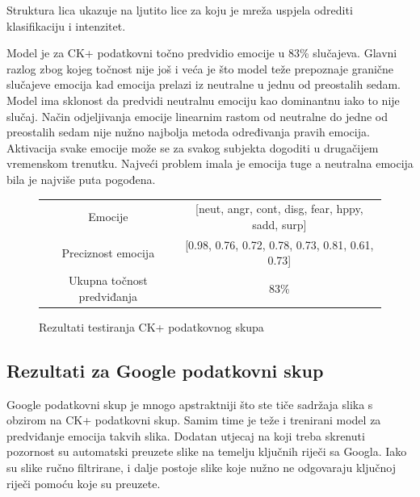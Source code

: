 \documentclass[times, utf8, zavrsni,numeric,pstricks]{fer}
\begin{document}
Struktura lica ukazuje na ljutito lice za koju je mreža uspjela odrediti klasifikaciju i intenzitet. 

Model je za CK+ podatkovni točno predvidio emocije u 83\% slučajeva. Glavni razlog zbog kojeg točnost nije još i veća je što model teže prepoznaje granične slučajeve emocija kad emocija prelazi iz neutralne u jednu od preostalih sedam. Model ima sklonost da predvidi neutralnu emociju kao dominantnu iako to nije slučaj. Način odjeljivanja emocije linearnim rastom od neutralne do jedne od preostalih sedam nije nužno najbolja metoda određivanja pravih emocija. Aktivacija svake emocije može se za svakog subjekta dogoditi u drugačijem vremenskom trenutku. Najveći problem imala je emocija tuge a neutralna emocija bila je najviše puta pogođena. 






\begin{figure}[H]
\centering
		\begin{tabular}
					{|c|c|}\hline
					Emocije & [neut, angr, cont, disg, fear, hppy, sadd, surp]\\
					Preciznost emocija& [0.98, 0.76, 0.72, 0.78, 0.73, 0.81, 0.61, 0.73] \\
					Ukupna točnost predviđanja & 83\%\\
					\hline
		\end{tabular}
		\caption{Rezultati testiranja CK+ podatkovnog skupa}
\end{figure}


\subsection{Rezultati za Google podatkovni skup}


Google podatkovni skup je mnogo apstraktniji što ste tiče sadržaja slika s obzirom na CK+ podatkovni skup. Samim time je teže i trenirani model za predviđanje emocija takvih slika. Dodatan utjecaj na koji treba skrenuti pozornost su automatski preuzete slike na temelju ključnih riječi sa Googla. Iako su slike ručno filtrirane, i dalje postoje slike koje nužno ne odgovaraju ključnoj riječi pomoću koje su preuzete.
\end{document}
